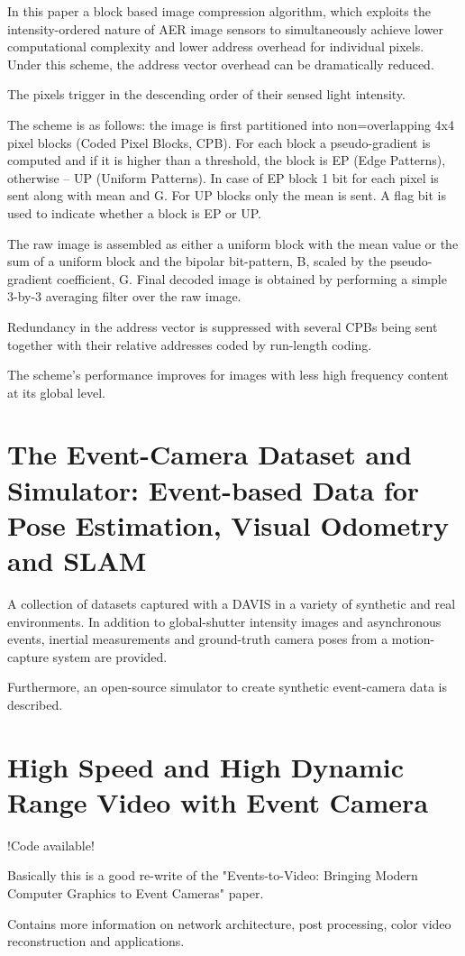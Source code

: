 \documentclass[10pt,a4paper]{article}
\begin{document}
In this paper a block based image compression algorithm, which exploits the intensity-ordered nature of AER image sensors to simultaneously achieve lower computational complexity and lower address overhead for individual pixels.
Under this scheme, the address vector overhead can be dramatically reduced.

The pixels trigger in the descending order of their sensed light intensity.

The scheme is as follows:
the image is first partitioned into non=overlapping 4x4 pixel blocks (Coded Pixel Blocks, CPB).
For each block a pseudo-gradient is computed and if it is higher than a threshold, the block is EP (Edge Patterns), otherwise -- UP (Uniform Patterns).
In case of EP block 1 bit for each pixel is sent along with mean and G.
For UP blocks only the mean is sent. A flag bit is used to indicate whether a block is EP or UP.

The raw image is assembled as either a uniform block with the mean value or the sum of a uniform block and the bipolar bit-pattern, B, scaled by the pseudo-gradient coefficient, G. Final decoded image is obtained by performing a simple 3-by-3 averaging filter over the raw image.

Redundancy in the address vector is suppressed with several CPBs being sent together with their relative addresses coded by run-length coding.

The scheme's performance improves for images with less high frequency content at its global level.

\section{The Event-Camera Dataset and Simulator: Event-based Data for Pose Estimation, Visual Odometry and SLAM}
A collection of datasets captured with a DAVIS in a variety of synthetic and real environments. 
In addition to global-shutter intensity images and asynchronous events, inertial measurements and ground-truth camera poses from a motion-capture system are provided.

Furthermore, an open-source simulator to create synthetic event-camera data is described.

\section{High Speed and High Dynamic Range Video with Event Camera}
!Code available!

Basically this is a good re-write of the "Events-to-Video: Bringing Modern Computer Graphics to Event Cameras" paper.

Contains more information on network architecture, post processing, color video reconstruction and applications.
\end{document}
